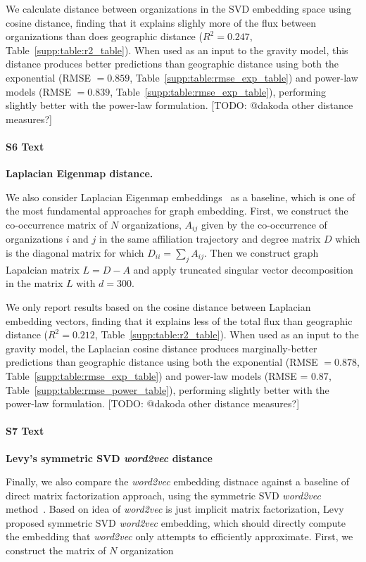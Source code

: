 \documentclass[12pt]{article} %
\newcommand{\todo}[1]{{\leavevmode\color{orange}[TODO: #1]}}
\begin{document}
We calculate distance between organizations in the SVD embedding space using cosine distance, finding that it explains slighly more of the flux between organizations than does geographic distance ($R^2=0.247$, Table~\ref{supp:table:r2_table}).
When used as an input to the gravity model, this distance produces better predictions than geographic distance using both the exponential (RMSE $= 0.859$, Table~\ref{supp:table:rmse_exp_table}) and power-law models (RMSE $= 0.839$, Table~\ref{supp:table:rmse_exp_table}), performing slightly better with the power-law formulation. 
\todo{@dakoda other distance measures?}

%
\paragraph*{S6 Text}
\label{si:text:Laplacian}
{\bf Laplacian Eigenmap distance.}

We also consider Laplacian Eigenmap embeddings~\autocite{belkin2003laplacian} as a baseline, which is one of the most fundamental approaches for graph embedding. 
First, we construct the co-occurrence matrix of $N$ organizations, $A_{ij}$ given by the co-occurrence of organizations $i$ and $j$ in the same affiliation trajectory and degree matrix $D$ which is the diagonal matrix for which $D_{ii}=\sum_j {A_{ij}}$. Then we construct graph Lapalcian matrix $L = D-A$  and apply truncated singular vector decomposition in the matrix $L$ with $d=300$.

We only report results based on the cosine distance between Laplacian embedding vectors, finding that it explains less of the total flux than geographic distance ($R^{2} = 0.212$, Table~\ref{supp:table:r2_table}). 
When used as an input to the gravity model, the Laplacian cosine distance produces marginally-better predictions than geographic distance using both the exponential (RMSE $= 0.878$, Table~\ref{supp:table:rmse_exp_table}) and power-law models (RMSE = $0.87$, Table~\ref{supp:table:rmse_power_table}), performing slightly better with the power-law formulation.  
\todo{@dakoda other distance measures?}


%
\paragraph*{S7 Text}
\label{si:text:levy}
{\bf Levy's  symmetric SVD \textit{word2vec} distance}


Finally, we also compare the \textit{word2vec} embedding distnace against a baseline of direct matrix factorization approach, using the symmetric SVD  \textit{word2vec} method~\autocite{levy2014neural}.
Based on idea of \textit{word2vec} is just implicit matrix factorization, Levy proposed symmetric SVD \textit{word2vec} embedding, which should directly compute the embedding that \textit{word2vec} only attempts to efficiently approximate.
First, we construct the matrix of $N$ organization
\end{document}
